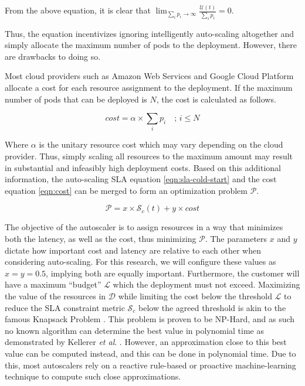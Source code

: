 From the above equation, it is clear that $\lim_{\sum_{i} p_{i} \to \infty} \frac{\mathcal{U}(t)}{\sum_{i} p_{i}} = 0$.


Thus, the equation incentivizes ignoring intelligently auto-scaling altogether and simply allocate the maximum number of pods to the deployment. However, there are drawbacks to doing so.\par

Most cloud providers such as Amazon Web Services and Google Cloud Platform allocate a cost for each resource assignment to the deployment. If the maximum number of pods that can be deployed is $N$, the cost is calculated as follows.

\begin{equation}
    cost = \alpha \times \sum_{i} p_{i} \quad ;\,i \le N
    \label{eqn:cost}
\end{equation}

Where $\alpha$ is the unitary resource cost which may vary depending on the cloud provider. Thus, simply scaling all resources to the maximum amount may result in substantial and infeasibly high deployment costs. Based on this additional information, the auto-scaling SLA equation \ref{eqn:sla-cold-start} and the cost equation \ref{eqn:cost} can be merged to form an optimization problem $\mathcal{P}$.

\begin{equation}
    \mathcal{P} = x \times \mathcal{S}_{c}(t) + y \times cost
    \label{eqn:optimization-problem}
\end{equation}

The objective of the autoscaler is to assign resources in a way that minimizes both the latency, as well as the cost, thus minimizing $\mathcal{P}$. The parameters $x$ and $y$ dictate how important cost and latency are relative to each other when considering auto-scaling. For this research, we will configure these values as $x = y = 0.5$, implying both are equally important. Furthermore, the customer will have a maximum ``budget'' $\mathcal{L}$ which the deployment must not exceed. Maximizing the value of the resources in $\mathcal{D}$ while limiting the cost below the threshold $\mathcal{L}$ to reduce the SLA constraint metric $\mathcal{S}_{c}$ below the agreed threshold is akin to the famous Knapsack Problem \cite{martello1987algorithms}. This problem is proven to be NP-Hard, and as such no known algorithm can determine the best value in polynomial time as demonstrated by Kellerer \textit{et al}. \cite{kellerer2004introduction}. However, an approximation close to this best value can be computed instead, and this can be done in polynomial time. Due to this, most autoscalers rely on a reactive rule-based or proactive machine-learning technique to compute such close approximations.\par


